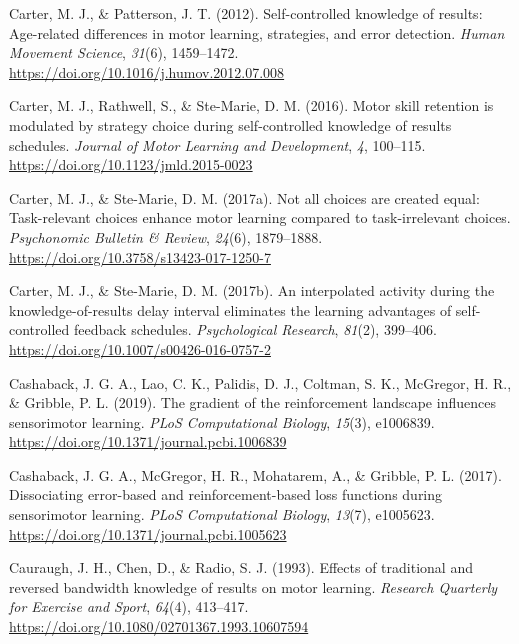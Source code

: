 \documentclass[
  man, donotrepeattitle,floatsintext]{apa7}
\newlength{\cslhangindent}
\newlength{\cslentryspacingunit} %
\newenvironment{CSLReferences}[2] %
 {%
  \setlength{\parindent}{0pt}
  \ifodd #1
  \let\oldpar\par
  \def\par{\hangindent=\cslhangindent\oldpar}
  \fi
  \setlength{\parskip}{#2\cslentryspacingunit}
 }%
 {}
\begin{document}
\begin{CSLReferences}{1}{0}
\leavevmode{}%
Carter, M. J., \& Patterson, J. T. (2012). Self-controlled knowledge of results: {Age-related} differences in motor learning, strategies, and error detection. \emph{Human Movement Science}, \emph{31}(6), 1459--1472. \url{https://doi.org/10.1016/j.humov.2012.07.008}

\leavevmode{}%
Carter, M. J., Rathwell, S., \& Ste-Marie, D. M. (2016). Motor skill retention is modulated by strategy choice during self-controlled knowledge of results schedules. \emph{Journal of Motor Learning and Development}, \emph{4}, 100--115. \url{https://doi.org/10.1123/jmld.2015-0023}

\leavevmode{}%
Carter, M. J., \& Ste-Marie, D. M. (2017a). Not all choices are created equal: {Task}-relevant choices enhance motor learning compared to task-irrelevant choices. \emph{Psychonomic Bulletin \& Review}, \emph{24}(6), 1879--1888. \url{https://doi.org/10.3758/s13423-017-1250-7}

\leavevmode{}%
Carter, M. J., \& Ste-Marie, D. M. (2017b). An interpolated activity during the knowledge-of-results delay interval eliminates the learning advantages of self-controlled feedback schedules. \emph{Psychological Research}, \emph{81}(2), 399--406. \url{https://doi.org/10.1007/s00426-016-0757-2}

\leavevmode{}%
Cashaback, J. G. A., Lao, C. K., Palidis, D. J., Coltman, S. K., McGregor, H. R., \& Gribble, P. L. (2019). The gradient of the reinforcement landscape influences sensorimotor learning. \emph{PLoS Computational Biology}, \emph{15}(3), e1006839. \url{https://doi.org/10.1371/journal.pcbi.1006839}

\leavevmode{}%
Cashaback, J. G. A., McGregor, H. R., Mohatarem, A., \& Gribble, P. L. (2017). Dissociating error-based and reinforcement-based loss functions during sensorimotor learning. \emph{PLoS Computational Biology}, \emph{13}(7), e1005623. \url{https://doi.org/10.1371/journal.pcbi.1005623}

\leavevmode{}%
Cauraugh, J. H., Chen, D., \& Radio, S. J. (1993). Effects of traditional and reversed bandwidth knowledge of results on motor learning. \emph{Research Quarterly for Exercise and Sport}, \emph{64}(4), 413--417. \url{https://doi.org/10.1080/02701367.1993.10607594}


\end{CSLReferences}
\end{document}
